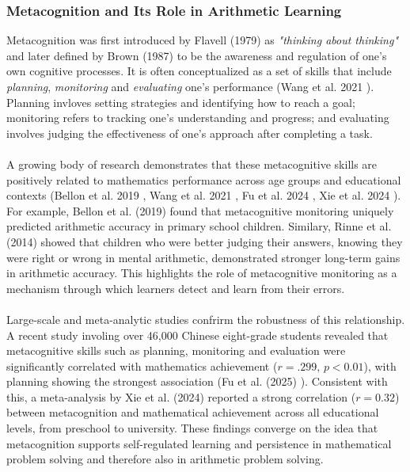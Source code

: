 \subsubsection{Metacognition and Its Role in Arithmetic Learning}
Metacognition was first introduced by Flavell (1979) \cite{flavell_metacognition_1979} as \textit{"thinking about thinking"} and later defined by Brown (1987) \cite{brown_metacognition_1987} to be the awareness and regulation of one's own cognitive processes.
It is often conceptualized as a set of skills that include \textit{planning}, \textit{monitoring} and \textit{evaluating} one's performance (Wang et al. 2021 \cite{wang_skill_2021}).
Planning invloves setting strategies and identifying how to reach a goal; monitoring refers to tracking one's understanding and progress; and evaluating involves judging the effectiveness of one's approach after completing a task.\\ \\
A growing body of research demonstrates that these metacognitive skills are positively related to mathematics performance across age groups and educational contexts (Bellon et al. 2019 \cite{bellon_more_2019}, Wang et al. 2021 \cite{wang_skill_2021}, Fu et al. 2024 \cite{fu_relationship_2025}, Xie et al. 2024 \cite{xie_meta_2024}).
For example, Bellon et al. (2019) \cite{bellon_more_2019} found that metacognitive monitoring uniquely predicted arithmetic accuracy in primary school children.
Similary, Rinne et al. (2014) \cite{rinne_knowing_2014} showed that children who were better judging their answers, knowing they were right or wrong in mental arithmetic, demonstrated stronger long-term gains in arithmetic accuracy.
This highlights the role of metacognitive monitoring as a mechanism through which learners detect and learn from their errors.\\ \\
Large-scale and meta-analytic studies confrirm the robustness of this relationship.
A recent study involing over 46,000 Chinese eight-grade students revealed that metacognitive skills such as planning, monitoring and evaluation were significantly correlated with mathematics achievement ($r = .299$, $p < 0.01$), with planning showing the strongest association (Fu et al. (2025) \cite{fu_relationship_2025}).
Consistent with this, a meta-analysis by Xie et al. (2024) \cite{xie_meta_2024} reported a strong correlation ($r = 0.32$) between metacognition and mathematical achievement across all educational levels, from preschool to university.
These findings converge on the idea that metacognition supports self-regulated learning and persistence in mathematical problem solving and therefore also in arithmetic problem solving.\\
